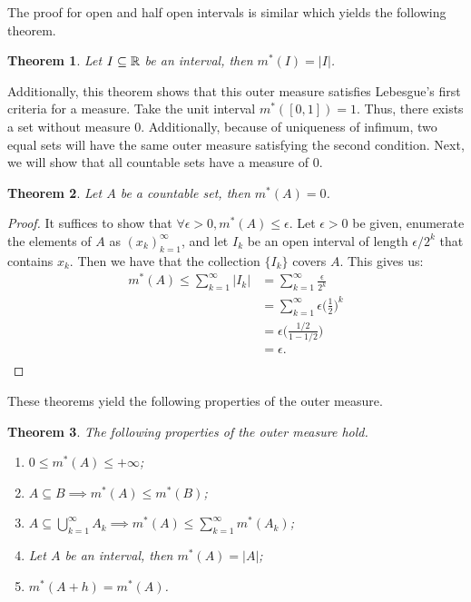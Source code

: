 \documentclass{article}
\newtheorem{theorem}{Theorem}
\theoremstyle{axiom} \newtheorem{axiom}{Axiom}
\theoremstyle{definition} \newtheorem{definition}{Definition}
\theoremstyle{example} \newtheorem{example}{Example}
\theoremstyle{proposition} \newtheorem{prop}{Proposition}
\theoremstyle{lemma} \newtheorem{lemma}{Lemma}
\begin{document}
The proof for open and half open intervals is similar which yields the following
theorem.
\begin{theorem}
	Let $I \subseteq \mathbb{R}$ be an interval, then $m^*(I) = |I|$.
\end{theorem}

Additionally, this theorem shows that this outer measure satisfies Lebesgue's 
first criteria for a measure. Take the unit  interval $m^*([0,1]) = 1$. 
Thus, there exists a set without measure $0$. Additionally, because of
uniqueness of infimum, two equal sets will have the same outer measure
satisfying the second condition.  Next, we will show that all 
countable sets have a measure of $0$. 
\begin{theorem}
	Let $A$ be a countable set, then $m^*(A) = 0$.
\end{theorem}
\begin{proof}
	It suffices to show that $\forall \epsilon > 0, m^*(A) \leq \epsilon$.
	Let $\epsilon > 0$ be given, enumerate the elements of $A$ as 
	$(x_k)^{\infty}_{k=1}$, and let $I_k$ be an open interval of length 
	$\epsilon/2^k$ that contains $x_k$. Then we have that the collection 
	$\{I_k\}$ covers $A$. This gives us: 
	\begin{equation*}
		\begin{split}
			m^*(A) \leq \sum_{k=1}^{\infty} |I_k| &= \sum_{k=1}^{\infty} \frac{\epsilon}{2^k}  \\
					&= \sum_{k=1}^{\infty} \epsilon \bigg(\frac{1}{2}\bigg)^k  \\
					&= \epsilon \bigg(\frac{1/2}{1-1/2}\bigg)  \\
					&= \epsilon. \\
		\end{split}
	\end{equation*}
\end{proof}

These theorems yield the following properties of the outer measure.
\begin{theorem} \label{thm:mprop}
	The following properties of the outer measure hold. 
	\begin{enumerate}
		\item $0 \leq m^*(A) \leq +\infty$;
		\item $A\subseteq B \implies  m^*(A) \leq m^*(B)$;
		\item $A\subseteq \bigcup^{\infty}_{k=1} A_k \implies m^*(A) \leq
			\sum^{\infty}_{k=1}m^*(A_k)$;
		\item Let $A$ be an interval, then $m^*(A) = |A|$;
		\item $m^*(A+h) = m^*(A)$.
	\end{enumerate}
\end{theorem}
\end{document}
